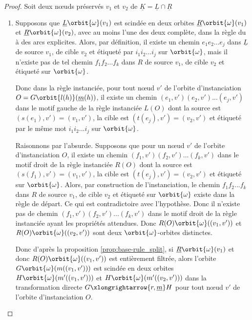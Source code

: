 \begin{proof}
	Soit deux nœuds préservés $v_1$ et $v_2$ de $\underline{K} = \underline{L} \cap \underline{R}$
	\begin{enumerate}
		\item Supposons que $\underline{L}\orbit{\omega}(v_1)$ est scindée en deux
		      orbites $\underline{R}\orbit{\omega}(v_1)$ et $\underline{R}\orbit{\omega}(v_2)$, avec au moins l'une des deux complète, dans la
		      règle du à des arcs explicites. Alors, par définition, il existe un chemin
		      $e_1 e_2 ... e_j$ dans $\underline{L}$ de source $v_1$, de cible $v_2$ et étiqueté par
		      $i_1 i_2 ... i_j$ sur $\orbit{\omega}$, mais il n'existe pas de tel chemin
		      $f_1 f_2 ... f_k$ dans $R$ de source $v_1$, de cible $v_2$ et étiqueté sur
		      $\orbit{\omega}$.

		      Donc dans la règle instanciée, pour tout nœud $v'$ de l'orbite
		      d'instanciation $O = G\orbit{l(h)}(\underline{m}(h))$, il existe un chemin
		      $(e_1,v') (e_2,v') ... (e_j,v')$ dans le motif gauche de la règle instanciée
		      $L(O)$ dont la source est $(s(e_1),v') = (v_1, v')$, la cible est
		      $(t(e_j), v') = (v_2, v')$ et étiqueté par le même mot $i_1 i_2 ... i_j$ sur
		      $\orbit{\omega}$.

		      Raisonnons par l'absurde. %
		      Supposons que pour un nœud $v'$ de l'orbite d'instanciation $O$, il
		      existe un chemin $(f_1,v') (f_2,v') ... (f_k,v')$ dans le motif droit de la
		      règle instanciée $R(O)$ dont la source est $(s(f_1),v') = (v_1, v')$, la cible
		      est $(t(e_j), v') = (v_2, v')$ et étiqueté sur $\orbit{\omega}$. Alors, par
		      construction de l'instanciation, le chemin $f_1 f_2 ... f_k$ dans $R$ de source
		      $v_1$, de cible $v_2$ et étiqueté sur $\orbit{\omega}$ existe dans la règle de
		      départ. Ce qui est contradictoire avec l'hypothèse. Donc il n'existe pas de
		      chemin $(f_1,v') (f_2,v') ... (f_k,v')$ dans le motif droit de la règle
		      instanciée ayant les propriétés attendues. Donc $R(O)\orbit{\omega}((v_1,v'))$ et
		      $R(O)\orbit{\omega}((v_2,v'))$ sont deux $\orbit{\omega}$-orbites distinctes.

		      Donc d'après la proposition \ref{prop:base-rule_split}, si
		      $\underline{R}\orbit{\omega}(v_1)$ et donc $R(O)\orbit{\omega}((v_1, v'))$ est entièrement
		      filtrée, alors l'orbite $G\orbit{\omega}(m((v_1,v')))$ est scindée en deux orbites
		      $H\orbit{\omega}(m'((v_1, v')))$ et $H\orbit{\omega}(m'((v_2, v')))$ dans la
		      transformation directe $G \xlongrightarrow{r,\underline{m}} H$ pour tout nœud
		      $v'$ de l'orbite d'instanciation $O$. %


\end{enumerate}
\end{proof}

